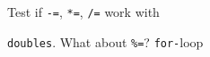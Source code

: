  Test if \texttt{-=}, \texttt{*=}, \texttt{/=} work with

\texttt{doubles}. What about \texttt{\%=}? \texttt{for-}loop


